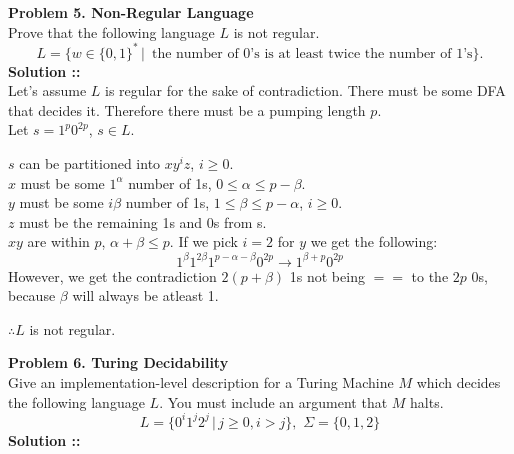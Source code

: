\documentclass[11pt]{article}
\begin{document}

\textbf{Problem 5. Non-Regular Language} \\
Prove that the following language $L$ is not regular.
$$L = \{w\in\{0,1\}^*\,|\,
\text{ the number of 0's is at least twice the number of 1's}\}.$$
\vspace{5px}\textbf{Solution ::} \\
Let's assume $L$ is regular for the sake of contradiction. There must be some DFA
that decides it. Therefore there must be a pumping length $p$. \\
Let $s = 1^p0^{2p}$, $s\in L$.

$s$ can be partitioned into $xy^iz$, $i\ge 0$. \\
$x$ must be some $1^\alpha$ number of 1s, $0\le\alpha\le p-\beta$. \\
$y$ must be some $i\beta$ number of 1s, $1\le\beta\le p-\alpha$, $i\ge 0$. \\
$z$ must be the remaining 1s and 0s from s. \\
$xy$ are within $p$, $\alpha+\beta\le p$. If we pick $i=2$ for $y$ we get the
following:
$$1^\beta 1^{2\beta} 1^{p-\alpha -\beta}0^{2p}\longrightarrow 1^{\beta+ p}0^{2p}$$
However, we get the contradiction $2(p+\beta)$ 1s not being $==$ to the $2p$ 0s,
because $\beta$ will always be atleast 1.

$\therefore L$ is not regular. 
\pagebreak


\textbf{Problem 6. Turing Decidability} \\
Give an implementation-level description for a Turing Machine $M$ which decides
the following language $L$. You must include an argument that $M$ halts.
$$L = \{0^i1^j2^j\,|\, j\ge 0, i>j\},\,\,\Sigma =\{0,1,2\}$$
\vspace{5px}\textbf{Solution ::}
\end{document}
